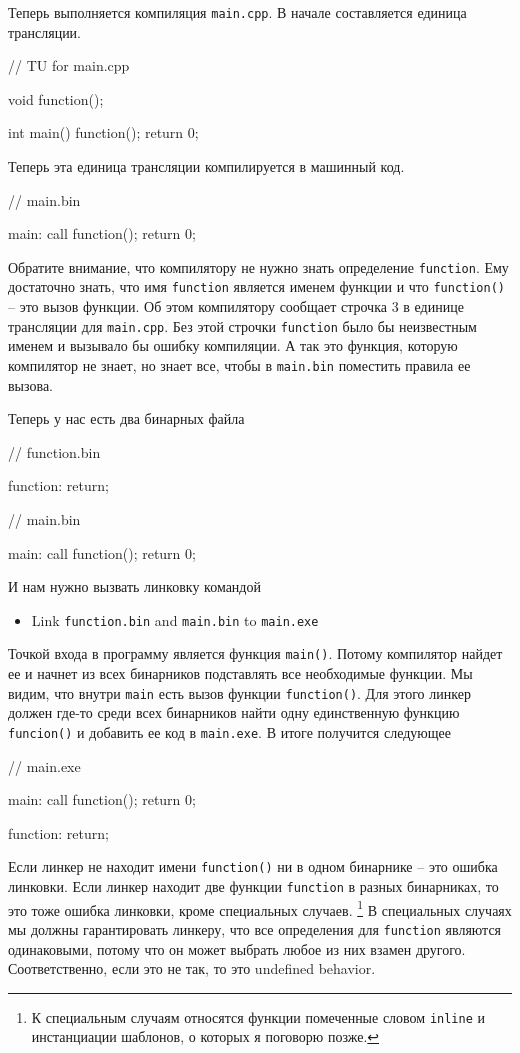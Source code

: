 Теперь выполняется компиляция \verb"main.cpp".
В начале составляется единица трансляции.
\begin{cppcode}
// TU for main.cpp

void function();

int main() {
  function();
  return 0;
}
\end{cppcode}
Теперь эта единица трансляции компилируется в машинный код.
\begin{cppcode}
// main.bin

main:
  call function();
  return 0;
\end{cppcode}

Обратите внимание, что компилятору не нужно знать определение \verb"function".
Ему достаточно знать, что имя \verb"function" является именем функции и что \verb"function()" -- это вызов функции.
Об этом компилятору сообщает строчка $3$ в единице трансляции для \verb"main.cpp".
Без этой строчки \verb"function" было бы неизвестным именем и вызывало бы ошибку компиляции.
А так это функция, которую компилятор не знает, но знает все, чтобы в \verb"main.bin" поместить правила ее вызова.

Теперь у нас есть два бинарных файла
\begin{cppcode}
// function.bin

function:
  return;
  
// main.bin

main:
  call function();
  return 0;
\end{cppcode}
И нам нужно вызвать линковку командой
\begin{itemize}
\item Link \verb"function.bin" and \verb"main.bin" to \verb"main.exe"
\end{itemize}
Точкой входа в программу является функция \verb"main()".
Потому компилятор найдет ее и начнет из всех бинарников подставлять все необходимые функции.
Мы видим, что внутри \verb"main" есть вызов функции \verb"function()".
Для этого линкер должен где-то среди всех бинарников найти одну единственную функцию \verb"funcion()" и добавить ее код в \verb"main.exe".
В итоге получится следующее
\begin{cppcode}
// main.exe

main:
  call function();
  return 0;

function:
  return;
\end{cppcode}
Если линкер не находит имени \verb"function()" ни в одном бинарнике -- это ошибка линковки.
Если линкер находит две функции \verb"function" в разных бинарниках, то это тоже ошибка линковки, кроме специальных случаев.%
\footnote{К специальным случаям относятся функции помеченные словом \verb"inline" и инстанциации шаблонов, о которых я поговорю позже.}
В специальных случаях мы должны гарантировать линкеру, что все определения для \verb"function" являются одинаковыми, потому что он может выбрать любое из них взамен другого.
Соответственно, если это не так, то это undefined behavior.

